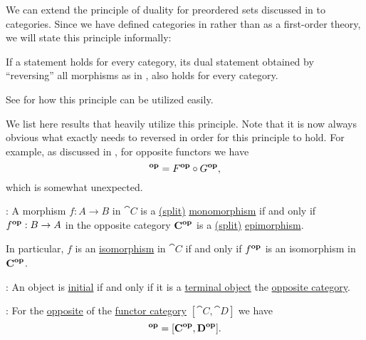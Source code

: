 \begin{proposition}\label{thm:categorical_principle_of_duality}
  We can extend the principle of duality for preordered sets discussed in  to categories. Since we have defined categories in \hyperref[def:axiom_of_universes]{} rather than as a first-order theory, we will state this principle informally:
  \begin{displayquote}
    If a statement holds for every category, its dual statement obtained by \enquote{reversing} all morphisms as in , also holds for every category.
  \end{displayquote}

  See  for how this principle can be utilized easily.

  We list here results that heavily utilize this principle. Note that it is now always obvious what exactly needs to reversed in order for this principle to hold. For example, as discussed in , for opposite functors we have
  \begin{equation*}
    [F \bincirc G]^\oppos = F^\oppos \bincirc G^\oppos,
  \end{equation*}
  which is somewhat unexpected.

  \begin{thmenum}
     : A morphism \( f: A \to B \) in \( \cat{C} \) is a \hyperref[def:morphism_invertibility/left_invertible]{(split)} \hyperref[def:morphism_invertibility/left_cancellative]{monomorphism} if and only if \( f^\oppos: B \to A \) in the opposite category \( \cat{C}^\oppos \) is a \hyperref[def:morphism_invertibility/right_invertible]{(split)} \hyperref[def:morphism_invertibility/right_cancellative]{epimorphism}.

    In particular, \( f \) is an \hyperref[def:morphism_invertibility/isomorphism]{isomorphism} in \( \cat{C} \) if and only if \( f^\oppos \) is an isomorphism in \( \cat{C}^\oppos \).

     : An object is \hyperref[def:universal_objects/initial]{initial} if and only if it is a \hyperref[def:universal_objects/terminal]{terminal object} the \hyperref[def:opposite_category]{opposite category}.

     : For the \hyperref[def:opposite_category]{opposite} of the \hyperref[def:functor_category]{functor category} \( [\cat{C}, \cat{D}] \) we have
    \begin{equation*}
      [\cat{C}, \cat{D}]^\oppos = [\cat{C}^\oppos, \cat{D}^\oppos].
    \end{equation*}


\end{thmenum}
\end{proposition}

